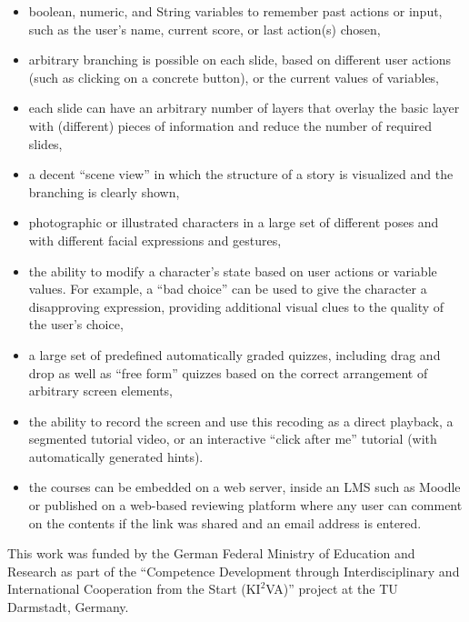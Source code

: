 \documentclass[sigconf,anonymous]{acmart}
\begin{document}
\begin{itemize}
\item boolean, numeric, and String variables to remember past actions or input, such as the user's  
name, current score, or last action(s) chosen,
\item arbitrary branching is possible on each slide, based on different user actions (such as
clicking on a concrete button), or the current values of variables,
\item each slide can have an arbitrary number of layers that overlay the basic layer with (different) pieces of
information and reduce the number of required slides,
\item a decent ``scene view'' in which the structure of a story is visualized and the branching is clearly
shown,
\item photographic or illustrated characters in a large set of different poses and with different
facial expressions and gestures,
\item the ability to modify a character's state based on user actions or variable values. For example,
a ``bad choice'' can be used to give the character a disapproving expression,
providing additional visual clues to the quality of the user's choice,
\item a large set of predefined automatically graded quizzes, including drag and drop as well as ``free form''
quizzes based on the correct arrangement of arbitrary screen elements,
\item the ability to record the screen and use this recoding as a direct playback, a segmented tutorial
video, or an interactive ``click after me'' tutorial (with automatically generated hints).
\item the courses can be embedded on a web server, inside an LMS such as Moodle \cite{Moodle}
or published on a web-based reviewing platform where any user can comment on the contents if the
link was shared and an email address is entered.
\end{itemize}

\begin{acks}
This work was funded by the German Federal Ministry of Education and Research as part of the 
``Competence Development through Interdisciplinary and International Cooperation from the Start
(K$\mathrm{I^2}$VA)'' project at the TU Darmstadt, Germany.
\end{acks}



\end{document}

